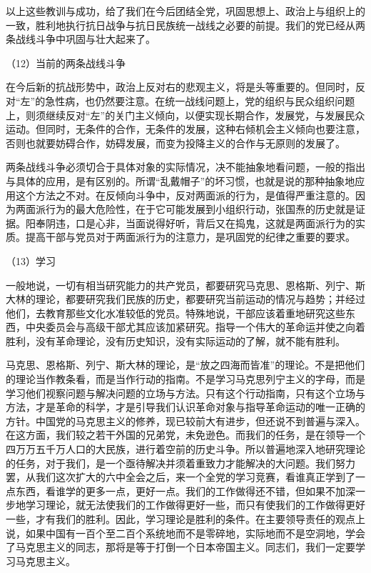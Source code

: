 \documentclass[UTF8, 12pt, a4paper]{ctexrep}
\begin{document}
以上这些教训与成功，给了我们在今后团结全党，巩固思想上、政治上与组织上的一致，胜利地执行抗日战争与抗日民族统一战线之必要的前提。我们的党已经从两条战线斗争中巩固与壮大起来了。

（12）当前的两条战线斗争

在今后新的抗战形势中，政治上反对右的悲观主义，将是头等重要的。但同时，反对“左”的急性病，也仍然要注意。在统一战线问题上，党的组织与民众组织问题上，则须继续反对“左”的关门主义倾向，以便实现长期合作，发展党，与发展民众运动。但同时，无条件的合作，无条件的发展，这种右倾机会主义倾向也要注意，否则也就要妨碍合作，妨碍发展，而变为投降主义的合作与无原则的发展了。

两条战线斗争必须切合于具体对象的实际情况，决不能抽象地看问题，一般的指出与具体的应用，是有区别的。所谓“乱戴帽子”的坏习惯，也就是说的那种抽象地应用这个方法之不对。在反倾向斗争中，反对两面派的行为，是值得严重注意的。因为两面派行为的最大危险性，在于它可能发展到小组织行动，张国焘的历史就是证据。阳奉阴违，口是心非，当面说得好听，背后又在捣鬼，这就是两面派行为的实质。提高干部与党员对于两面派行为的注意力，是巩固党的纪律之重要的要求。

（13）学习

一般地说，一切有相当研究能力的共产党员，都要研究马克思、恩格斯、列宁、斯大林的理论，都要研究我们民族的历史，都要研究当前运动的情况与趋势；并经过他们，去教育那些文化水准较低的党员。特殊地说，干部应该着重地研究这些东西，中央委员会与高级干部尤其应该加紧研究。指导一个伟大的革命运并使之向着胜利，没有革命理论，没有历史知识，没有实际运动的了解，就不能有胜利。

马克思、恩格斯、列宁、斯大林的理论，是“放之四海而皆准”的理论。不是把他们的理论当作教条看，而是当作行动的指南。不是学习马克思列宁主义的字母，而是学习他们视察问题与解决问题的立场与方法。只有这个行动指南，只有这个立场与方法，才是革命的科学，才是引导我们认识革命对象与指导革命运动的唯一正确的方针。中国党的马克思主义的修养，现已较前大有进步，但还说不到普遍与深入。在这方面，我们较之若干外国的兄弟党，未免逊色。而我们的任务，是在领导一个四万万五千万人口的大民族，进行着空前的历史斗争。所以普遍地深入地研究理论的任务，对于我们，是一个亟待解决并须着重致力才能解决的大问题。我们努力罢，从我们这次扩大的六中全会之后，来一个全党的学习竞赛，看谁真正学到了一点东西，看谁学的更多一点，更好一点。我们的工作做得还不错，但如果不加深一步地学习理论，就无法使我们的工作做得更好一些，而只有使我们的工作做得更好一些，才有我们的胜利。因此，学习理论是胜利的条件。在主要领导责任的观点上说，如果中国有一百个至二百个系统地而不是零碎地，实际地而不是空洞地，学会了马克思主义的同志，那将是等于打倒一个日本帝国主义。同志们，我们一定要学习马克思主义。
\end{document}
